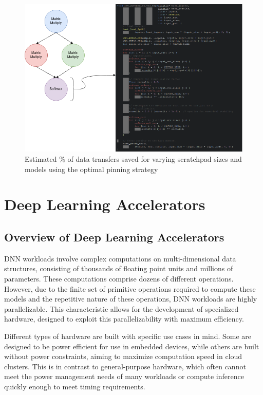 \begin{figure}[th]
\centering
\includegraphics[scale=0.5]{Figures/operator_to_kernel.png}
\decoRule
\caption[Simple Operator Kernel]{Estimated \% of data transfers saved for varying scratchpad sizes and models using the optimal pinning strategy}
\label{fig:OperatorKernel}
\end{figure}


\section{Deep Learning Accelerators}

\subsection{Overview of Deep Learning Accelerators}

DNN workloads involve complex computations on multi-dimensional data
structures, consisting of thousands of floating point units and millions of
parameters. These computations comprise dozens of different operations.
However, due to the finite set of primitive operations required to compute
these models and the repetitive nature of these operations, DNN workloads are
highly parallelizable. This characteristic allows for the development of
specialized hardware, designed to exploit this parallelizability with maximum
efficiency.

Different types of hardware are built with specific use cases in mind. Some are
designed to be power efficient for use in embedded devices, while others are
built without power constraints, aiming to maximize computation speed in cloud
clusters. This is in contrast to general-purpose hardware, which often cannot
meet the power management needs of many workloads or compute inference quickly
enough to meet timing requirements.

